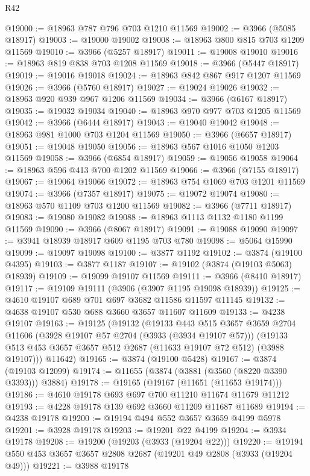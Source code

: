 \begin{lexlean}{R42}
\begin{coremodule}
@19000 := @18963 @787 @796 @703 @1210 @11569
@19002 := @3966 (@5085 @18917)
@19003 := @19000 @19002
@19008 := @18963 @800 @815 @703 @1209 @11569
@19010 := @3966 (@5257 @18917)
@19011 := @19008 @19010
@19016 := @18963 @819 @838 @703 @1208 @11569
@19018 := @3966 (@5447 @18917)
@19019 := @19016 @19018
@19024 := @18963 @842 @867 @917 @1207 @11569
@19026 := @3966 (@5760 @18917)
@19027 := @19024 @19026
@19032 := @18963 @920 @939 @967 @1206 @11569
@19034 := @3966 (@6167 @18917)
@19035 := @19032 @19034
@19040 := @18963 @970 @977 @703 @1205 @11569
@19042 := @3966 (@6444 @18917)
@19043 := @19040 @19042
@19048 := @18963 @981 @1000 @703 @1204 @11569
@19050 := @3966 (@6657 @18917)
@19051 := @19048 @19050
@19056 := @18963 @567 @1016 @1050 @1203 @11569
@19058 := @3966 (@6854 @18917)
@19059 := @19056 @19058
@19064 := @18963 @596 @413 @700 @1202 @11569
@19066 := @3966 (@7155 @18917)
@19067 := @19064 @19066
@19072 := @18963 @754 @1069 @703 @1201 @11569
@19074 := @3966 (@7357 @18917)
@19075 := @19072 @19074
@19080 := @18963 @570 @1109 @703 @1200 @11569
@19082 := @3966 (@7711 @18917)
@19083 := @19080 @19082
@19088 := @18963 @1113 @1132 @1180 @1199 @11569
@19090 := @3966 (@8067 @18917)
@19091 := @19088 @19090
@19097 := @3941 @18939 @18917 @609 @1195 @703 @780
@19098 := @5064 @15990
@19099 := @19097 @19098
@19100 := @3877 @1192
@19102 := @3874 (@19100 @4395)
@19103 := @3877 @1187
@19107 := @19102 (@3874 (@19103 @5063) @18939)
@19109 := @19099 @19107 @11569
@19111 := @3966 (@8410 @18917)
@19117 := @19109 @19111 (@3906 (@3907 @1195 @19098 @18939))
@19125 := @4610 @19107 @689 @701 @697 @3682 @11586 @11597 @11145
@19132 := @4638 @19107 @530 @688 @3660 @3657 @11607 @11609
@19133 := @4238 @19107
@19163 := @19125
    (@19132
      (@19133
        @443
        @515
        @3657
        @3659
        @2704
        @11606
        (@3928 @19107 @57 @2704 (@3933 (@3934 @19107 @57)))
        (@19133 @513 @453 @3657 @3657 @512 @2687 (@11633 @19107 @72 @512) (@3988 @19107)))
      @11642)
@19165 := @3874 (@19100 @5428)
@19167 := @3874 (@19103 @12099)
@19174 := @11655 (@3874 (@3881 (@3560 (@8220 @3390 @3393))) @3884)
@19178 := @19165 (@19167 (@11651 (@11653 @19174)))
@19186 := @4610 @19178 @693 @697 @700 @11210 @11674 @11679 @11212
@19193 := @4228 @19178 @139 @692 @3660 @11209 @11687 @11689
@19194 := @4238 @19178
@19200 := @19194 @494 @552 @3657 @3659 @4199 @5978
@19201 := @3928 @19178
@19203 := @19201 @22 @4199
@19204 := @3934 @19178
@19208 := @19200 (@19203 (@3933 (@19204 @22)))
@19220 := @19194 @550 @453 @3657 @3657 @2808 @2687 (@19201 @49 @2808 (@3933 (@19204 @49)))
@19221 := @3988 @19178

\end{coremodule}
\end{lexlean}
